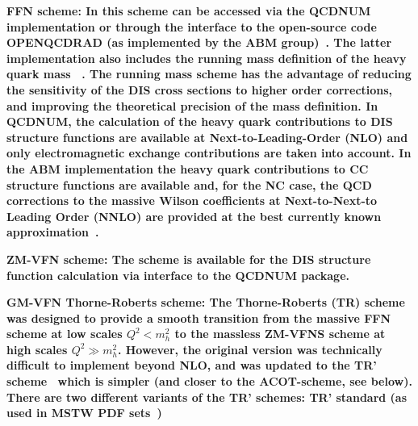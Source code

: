\begin{description}
\item \bf {FFN scheme:} \rm
In \fitter this scheme can be accessed via the 
QCDNUM implementation or through the interface to the open-source code OPENQCDRAD (as implemented by the ABM group)~\cite{openqcdrad:page}.
The latter implementation also includes the running mass definition of the heavy quark 
mass ~\cite{Alekhin:runm}.
The running mass scheme has the advantage of reducing the sensitivity of the DIS cross sections to
higher order corrections, and improving the theoretical precision of the mass definition. 
In QCDNUM, the calculation of the heavy quark contributions to DIS structure functions
are available at Next-to-Leading-Order (NLO) and only electromagnetic exchange contributions are taken into account.
In the ABM implementation the heavy quark contributions to CC structure functions are available 
and, for the NC case, the QCD corrections to the massive Wilson coefficients at Next-to-Next-to Leading Order (NNLO)
are provided at the best currently known approximation~\cite{SMoch:npb864}.
\item  
\bf {ZM-VFN scheme:} \rm 
The scheme is available for the DIS structure function calculation via interface to the QCDNUM package.
%
\item \bf {GM-VFN Thorne-Roberts scheme:} \rm
%
%
The Thorne-Roberts (TR) scheme~\cite{Thorne:1997ga} was designed to provide a smooth transition 
from the massive FFN scheme at low scales $Q^2 < m_h^2$ to the massless ZM-VFNS scheme at high scales $Q^2 \gg m_h^2$. 
However, the original version was technically difficult to implement beyond NLO, and was updated 
to the TR' scheme~\cite{Thorne:2006qt} which is simpler (and closer to the ACOT-scheme, see below).
There are two different variants of the TR' schemes: TR' standard (as used in MSTW PDF sets~\cite{Thorne:2006qt,MSTWpdf}) 

\end{description}
